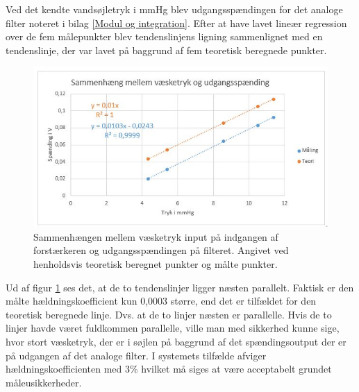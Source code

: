 Ved det kendte vandsøjletryk i mmHg blev udgangsspændingen for det analoge filter noteret i bilag \ref{Modul og integration}. Efter at have lavet lineær regression over de fem målepunkter blev tendenslinjens ligning sammenlignet med en tendenslinje, der var lavet på baggrund af fem teoretisk beregnede punkter. 

\begin{figure}[H]
	\centering
	\includegraphics[width=1\textwidth]{Figurer/Hardware/VaesketrykUdgangsspaending}
	\caption{Sammenhængen mellem væsketryk input på indgangen af forstærkeren og udgangsspændingen på filteret. Angivet ved henholdsvis teoretisk beregnet punkter og målte punkter.}
	\label{fig:Vaesketryk}
\end{figure}

Ud af figur \ref{fig:Vaesketryk} ses det, at de to tendenslinjer ligger næsten parallelt. Faktisk er den målte hældningskoefficient kun 0,0003 større, end det er tilfældet for den teoretisk beregnede linje. Dvs. at de to linjer næsten er parallelle. Hvis de to linjer havde været fuldkommen parallelle, ville man med sikkerhed kunne sige, hvor stort væsketryk, der er i søjlen på baggrund af det spændingsoutput der er på udgangen af det analoge filter. I systemets tilfælde afviger hældningskoefficienten med 3\% hvilket må siges at være acceptabelt grundet måleusikkerheder.

